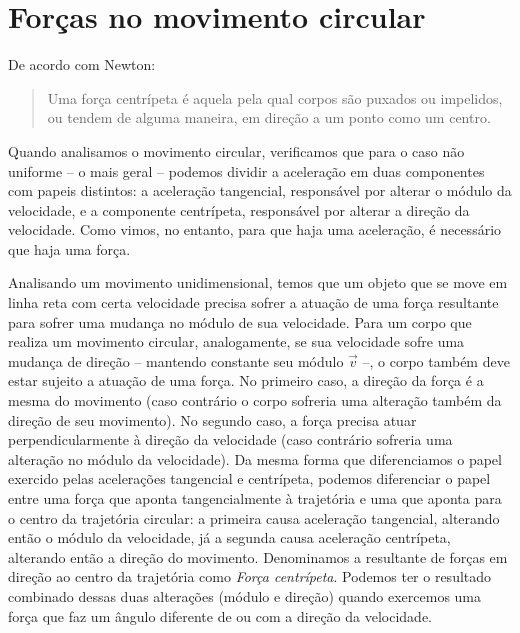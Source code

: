 \section{Forças no movimento circular}

De acordo com Newton:
\begin{quote}
    Uma força centrípeta é aquela pela qual corpos são puxados ou impelidos, ou tendem de alguma maneira, em direção a um ponto como um centro.
\end{quote}

Quando analisamos o movimento circular, verificamos que para o caso não uniforme -- o mais geral -- podemos dividir a aceleração em duas componentes com papeis distintos: a aceleração tangencial, responsável por alterar o módulo da velocidade, e a componente centrípeta, responsável por alterar a direção da velocidade. Como vimos, no entanto, para que haja uma aceleração, é necessário que haja uma força. 

Analisando um movimento unidimensional, temos que um objeto que se move em linha reta com certa velocidade precisa sofrer a atuação de uma força resultante para sofrer uma mudança no módulo de sua velocidade. Para um corpo que realiza um movimento circular, analogamente, se sua velocidade sofre uma mudança de direção -- mantendo constante seu módulo $\vec{v}$ --, o corpo também deve estar sujeito a atuação de uma força. No primeiro caso, a direção da força é a mesma do movimento (caso contrário o corpo sofreria uma alteração também da direção de seu movimento). No segundo caso, a força precisa atuar perpendicularmente à direção da velocidade (caso contrário sofreria uma alteração no módulo da velocidade). Da mesma forma que diferenciamos o papel exercido pelas acelerações tangencial e centrípeta, podemos diferenciar o papel entre uma força que aponta tangencialmente à trajetória e uma que aponta para o centro da trajetória circular: a primeira causa aceleração tangencial, alterando então o módulo da velocidade, já a segunda causa aceleração centrípeta, alterando então a direção do movimento. Denominamos a resultante de forças em direção ao centro da trajetória como \emph{Força centrípeta}. Podemos ter o resultado combinado dessas duas alterações (módulo e direção) quando exercemos uma força que faz um ângulo diferente de  ou  com a direção da velocidade.

